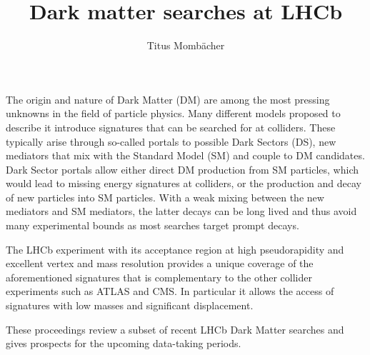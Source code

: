 \documentclass[a4paper,11pt]{article}
\title{Dark matter searches at LHCb}
\author*[a,\dagger]{Titus Momb\"acher}
\affiliation[a]{Instituto Galego de Física de Altas Enerxías,\\
  Rúa de Xoaquín Díaz de Rábago, s/n, Santiago de Compostela, Spain}
\begin{document}
\maketitle

The origin and nature of Dark Matter (DM) are among the most pressing unknowns in the field of particle physics.
Many different models proposed to describe it introduce signatures that can be searched for at colliders.
These typically arise through so-called portals to possible Dark Sectors (DS), new mediators that mix with the Standard Model (SM) and couple to DM candidates.
Dark Sector portals allow either direct DM production from SM particles, which would lead to missing energy signatures at colliders, or the production and decay of new particles into SM particles. With a weak mixing between the new mediators and SM mediators, the latter decays can be long lived and thus avoid many experimental bounds as most searches target prompt decays.

The LHCb experiment with its acceptance region at high pseudorapidity and excellent vertex and mass resolution provides a unique coverage of the aforementioned signatures that is complementary to the other collider experiments such as ATLAS and CMS. In particular it allows the access of signatures with low masses and significant displacement.

These proceedings review a subset of recent LHCb Dark Matter searches and gives prospects for the upcoming data-taking periods.
\end{document}
